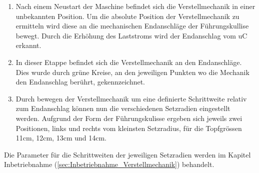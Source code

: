 \begin{enumerate}
	\item Nach einem Neustart der Maschine befindet sich die Verstellmechanik in einer unbekannten Position. Um die absolute Position der Verstellmechanik zu ermitteln wird diese an die mechanischen Endanschläge der Führungskullise bewegt. Durch die Erhöhung des Laststroms wird der Endanschlag vom uC erkannt.
	\item In dieser Etappe befindet sich die Verstellmechanik an den Endanschläge. Dies wurde durch grüne Kreise, an den jeweiligen Punkten wo die Mechanik den Endanschlag berührt, gekennzeichnet.
	\item Durch bewegen der Verstellmechanik um eine definierte Schrittweite relativ zum Endanschlag können nun die verschiedenen Setzradien eingestellt werden. Aufgrund der Form der Führungskulisse ergeben sich jeweils zwei Positionen, links und rechts vom kleinsten Setzradius, für die Topfgrössen 11cm, 12cm, 13cm und 14cm.
\end{enumerate}

Die Parameter für die Schrittweiten der jeweiligen Setzradien werden im Kapitel Inbetriebnahme (\ref{sec:Inbetriebnahme_Verstellmechanik}) behandelt.